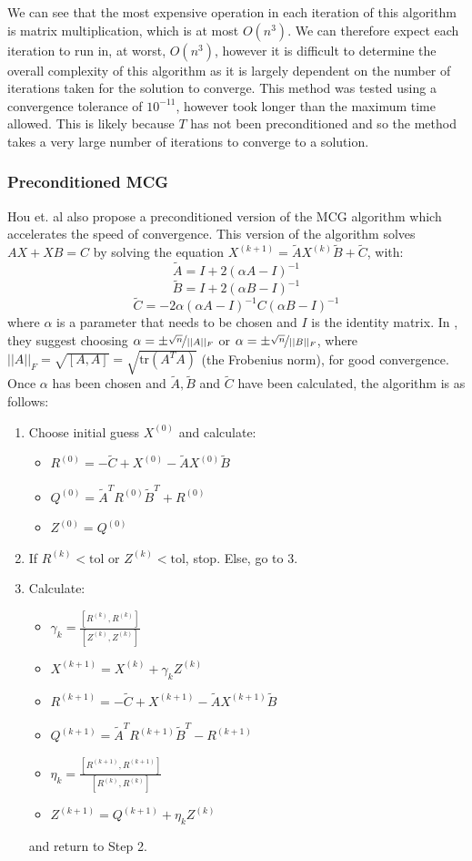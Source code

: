 \documentclass[11pt]{article}
\numberwithin{equation}{section}
\begin{document}
We can see that the most expensive operation in each iteration of this algorithm is matrix multiplication, which is at most $O(n^3)$. We can therefore expect each iteration to run in, at worst, $O(n^3)$, however it is difficult to determine the overall complexity of this algorithm as it is largely dependent on the number of iterations taken for the solution to converge. This method was tested using a convergence tolerance of $10^{-11}$, however took longer than the maximum time allowed. This is likely because $T$ has not been preconditioned and so the method takes a very large number of iterations to converge to a solution.

\subsubsection{Preconditioned MCG}
Hou et. al \cite{Hou} also propose a preconditioned version of the MCG algorithm which accelerates the speed of convergence. This version of the algorithm solves $AX + XB = C$ by solving the equation 
$X^{(k+1)} = \widetilde{A}X^{(k)} \widetilde{B} + \widetilde{C}$, with:
\[ \widetilde{A} = I + 2(\alpha A - I)^{-1} \]
\[ \widetilde{B} = I + 2(\alpha B - I)^{-1} \]
\[ \widetilde{C} = -2\alpha(\alpha A - I)^{-1} C (\alpha B - I)^{-1} \]
where $\alpha$ is a parameter that needs to be chosen and $I$ is the identity matrix. In \cite{Hou}, they suggest choosing $\alpha = \pm \nicefrac{\sqrt{n}}{||A||_F}$ or $\alpha = \pm \nicefrac{\sqrt{n}}{||B||_F}$, where $||A||_F = \sqrt{[A,A]} = \sqrt{\text{tr}(A^TA)}$ (the Frobenius norm), for good convergence. Once $\alpha$ has been chosen and $\widetilde{A}, \widetilde{B}$ and $\widetilde{C}$ have been calculated, the algorithm is as follows:
\begin{enumerate}
\item Choose initial guess $X^{(0)}$ and calculate:
	\begin{itemize}
	\item $R^{(0)} = -\widetilde{C} + X^{(0)} - \widetilde{A}X^{(0)} \widetilde{B}$
	\item $Q^{(0)} = \widetilde{A}^T R^{(0)}\widetilde{B}^T + R^{(0)}$
	\item $Z^{(0)} = Q^{(0)}$
	\end{itemize}
\item If $R^{(k)} < \text{tol}$ or $Z^{(k)} < \text{tol}$, stop. Else, go to 3.
\item Calculate:
	\begin{itemize}
	\item $ \gamma_k = \frac{[R^{(k)}, R^{(k)}]}{[Z^{(k)}, Z^{(k)}]}$
	\item $X^{(k+1)} = X^{(k)} + \gamma_k Z^{(k)} $
	\item $R^{(k+1)} = -\widetilde{C} + X^{(k+1)} - \widetilde{A}X^{(k+1)} \widetilde{B}$
	\item $Q^{(k+1)} = \widetilde{A}^T R^{(k+1)}\widetilde{B}^T - R^{(k+1)}$
	\item $\eta_k = \frac{[R^{(k+1)}, R^{(k+1)}]}{[R^{(k)}, R^{(k)}]}$ 
	\item $Z^{(k+1)} = Q^{(k+1)} + \eta_k Z^{(k)}$
	\end{itemize}
	and return to Step 2.
\end{enumerate}
\end{document}
